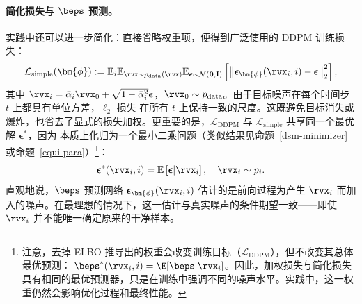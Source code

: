 \paragraph{简化损失与 $\beps$ 预测。}
实践中还可以进一步简化：直接省略权重项，便得到广泛使用的 DDPM 训练损失：
\begin{equation}\label{eq:ddpm-simple-loss}
    \mathcal{L}_{\text{simple}}(\bm{\phi}) := \mathbb{E}_{i} \mathbb{E}_{\rvx \sim p_{\text{data}}(\rvx)} \mathbb{E}_{\boldsymbol{\epsilon} \sim \mathcal{N}(\mathbf{0}, \mathbf{I})} \left[ \left\| \boldsymbol{\epsilon}_{\bm{\phi}}(\rvx_i, i) - \boldsymbol{\epsilon} \right\|_2^2 \right],
\end{equation}
其中 $\rvx_i = \bar{\alpha}_i \rvx_0 + \sqrt{1 - \bar{\alpha}_i^2} \boldsymbol{\epsilon}$，$\rvx_0 \sim p_{\text{data}}$。由于目标噪声在每个时间步 $t$ 上都具有单位方差，$\ell_2$ 损失  在所有 $t$ 上保持一致的尺度。这既避免目标消失或爆炸，也省去了显式的损失加权。更重要的是，$\mathcal{L}_{\text{DDPM}}$ 与 $\mathcal{L}_{\text{simple}}$ 共享同一个最优解 $\boldsymbol{\epsilon}^*$，因为  本质上化归为一个最小二乘问题（类似结果见命题~\ref{dsm-minimizer} 或命题~\ref{equi-para}）\footnote{注意，去掉 ELBO 推导出的权重会改变训练目标（$\mathcal{L}_{\text{DDPM}}$），但不改变其总体最优预测： $\beps^*(\rvx_i,i)
=
\E[\beps| \rvx_i]$。因此，加权损失与简化损失具有相同的最优预测器，只是在训练中强调不同的噪声水平。实践中，这一权重仍然会影响优化过程和最终性能。}：
\[
\boldsymbol{\epsilon}^*(\rvx_i, i) = \mathbb{E}\left[ \boldsymbol{\epsilon}|\rvx_i \right], \quad \rvx_i \sim p_i.
\]
直观地说，$\beps$ 预测网络 $\boldsymbol{\epsilon}_{\bm{\phi}}(\rvx_i, i)$ 估计的是前向过程为产生 $\rvx_i$ 而加入的噪声。在最理想的情况下，这一估计与真实噪声的条件期望一致——即使 $\rvx_i$ 并不能唯一确定原来的干净样本。


